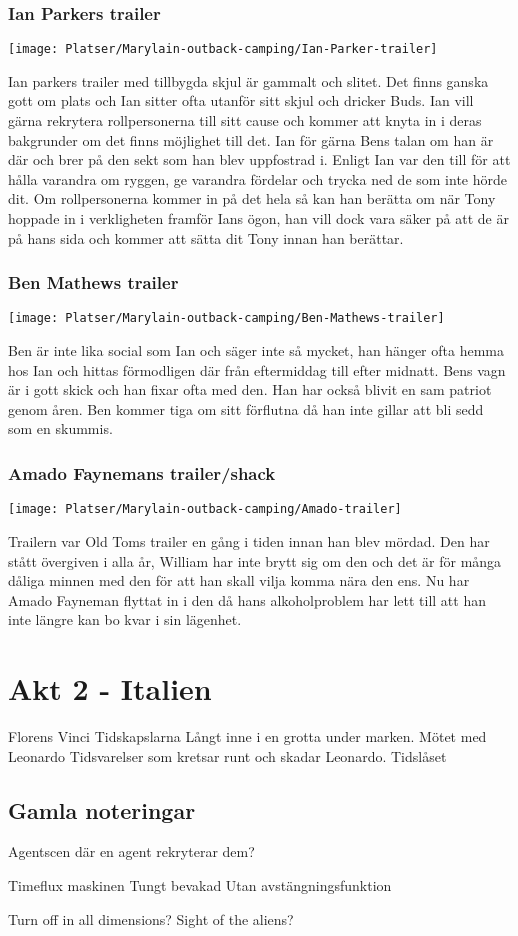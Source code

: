 \documentclass[a5paper,10pt]{report}
\begin{document}
\subsection{Ian Parkers trailer}
\texttt{[image: Platser/Marylain-outback-camping/Ian-Parker-trailer]}

Ian parkers trailer med tillbygda skjul är gammalt och slitet. Det finns ganska gott om plats och Ian sitter ofta utanför sitt skjul och dricker Buds. Ian vill gärna rekrytera rollpersonerna till sitt cause och kommer att knyta in i deras bakgrunder om det finns möjlighet till det. Ian för gärna Bens talan om han är där och brer på den sekt som han blev uppfostrad i. Enligt Ian var den till för att hålla varandra om ryggen, ge varandra fördelar och trycka ned de som inte hörde dit. Om rollpersonerna kommer in på det hela så kan han berätta om när Tony hoppade in i verkligheten framför Ians ögon, han vill dock vara säker på att de är på hans sida och kommer att sätta dit Tony innan han berättar.
\clearpage
\subsection{Ben Mathews trailer}
\texttt{[image: Platser/Marylain-outback-camping/Ben-Mathews-trailer]}

Ben är inte lika social som Ian och säger inte så mycket, han hänger ofta hemma hos Ian och hittas förmodligen där från eftermiddag till efter midnatt. Bens vagn är i gott skick och han fixar ofta med den. Han har också blivit en sam patriot genom åren. Ben kommer tiga om sitt förflutna då han inte gillar att bli sedd som en skummis.
\clearpage
\subsection{Amado Faynemans trailer/shack}
\texttt{[image: Platser/Marylain-outback-camping/Amado-trailer]}

Trailern var Old Toms trailer en gång i tiden innan han blev mördad. Den har stått övergiven i alla år, William har inte brytt sig om den och det är för många dåliga minnen med den för att han skall vilja komma nära den ens. Nu har Amado Fayneman flyttat in i den då hans alkoholproblem har lett till att han inte längre kan bo kvar i sin lägenhet.
\chapter{Akt 2 - Italien}
Florens
Vinci
Tidskapslarna
Långt inne i en grotta under marken.
Mötet med Leonardo
Tidsvarelser som kretsar runt och skadar Leonardo.
Tidslåset
\clearpage
\section{Gamla noteringar}

Agentscen där en agent rekryterar dem?

Timeflux maskinen
  Tungt bevakad
  Utan avstängningsfunktion

Turn off in all dimensions?
  Sight of the aliens?
\end{document}
